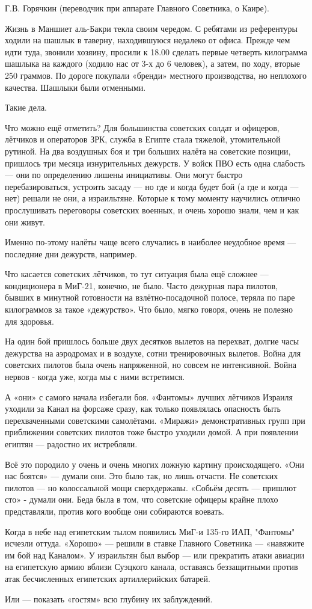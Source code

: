 Г.В. Горячкин (переводчик при аппарате Главного Советника, о Каире).

\begin{textcitation}
	Жизнь в Маншиет аль-Бакри текла своим чередом. С ребятами из референтуры ходили на шашлык в таверну, находившуюся недалеко от офиса. Прежде чем идти туда, звонили хозяину, просили к 18.00 сделать первые четверть килограмма шашлыка на каждого (ходило нас от 3-х до 6 человек), а затем, по ходу, вторые 250 граммов. По дороге покупали «бренди» местного производства, но неплохого качества. Шашлыки были отменными.
\end{textcitation}

Такие дела.

Что можно ещё отметить? Для большинства советских солдат и офицеров, лётчиков и операторов ЗРК, служба в Египте стала тяжелой, утомительной рутиной. На два воздушных боя и три больших налёта на советские позиции, пришлось три месяца изнурительных дежурств. У войск ПВО есть одна слабость — они по определению лишены инициативы. Они могут быстро перебазироваться, устроить засаду — но где и когда будет бой (а где и когда — нет) решали не они, а израильтяне. Которые к тому моменту научились отлично прослушивать переговоры советских военных, и очень хорошо знали, чем и как они живут.

Именно по-этому налёты чаще всего случались в наиболее неудобное время — последние дни дежурств, например.

Что касается советских лётчиков, то тут ситуация была ещё сложнее — кондиционера в МиГ-21, конечно, не было. Часто дежурная пара пилотов, бывших в минутной готовности на взлётно-посадочной полосе, теряла по паре килограммов за такое «дежурство». Что было, мягко говоря, очень не полезно для здоровья.

На один бой пришлось больше двух десятков вылетов на перехват, долгие часы дежурства на аэродромах и в воздухе, сотни тренировочных вылетов. Война для советских пилотов была очень напряженной, но совсем не интенсивной. Война нервов - когда уже, когда мы с ними встретимся.

А «они» с самого начала избегали боя. «Фантомы» лучших лётчиков Израиля уходили за Канал на форсаже сразу, как только появлялась опасность быть перехваченными советскими самолётами. «Миражи» демонстративных групп при приближении советских пилотов тоже быстро уходили домой. А при появлении египтян — радостно их истребляли.

Всё это породило у очень и очень многих ложную картину происходящего. «Они нас боятся» — думали они. Это было так, но лишь отчасти. Не советских пилотов — но колоссальной мощи сверхдержавы. «Собьём десять — пришлют сто» - думали они. Беда была в том, что советские офицеры крайне плохо представляли, против кого вообще они собираются воевать.

Когда в небе над египетским тылом появились МиГ-и 135-го ИАП, "Фантомы" исчезли оттуда. «Хорошо» — решили в ставке Главного Советника — «навяжите им бой над Каналом». У израильтян был выбор — или прекратить атаки авиации на египетскую армию вблизи Суэцкого канала, оставаясь беззащитными против атак бесчисленных египетских артиллерийских батарей.

Или — показать «гостям» всю глубину их заблуждений.